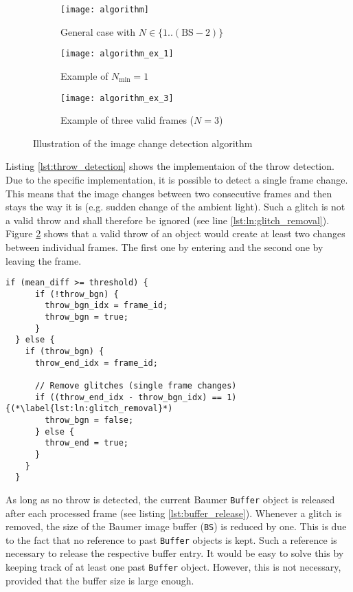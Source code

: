 \begin{figure}[H]
  \centering
  \begin{subfigure}[b]{\textwidth}
    \texttt{[image: algorithm]}
    \caption{General case with $N \in \{1..(\text{BS}-2)\}$}
    \label{subfig:algorithm_general_case}
  \end{subfigure}
  \begin{subfigure}[b]{\textwidth}
    \texttt{[image: algorithm\_ex\_1]}
    \caption{Example of $N_\text{min} = 1$}
    \label{subfig:algorithm_example_1}
  \end{subfigure}
  \begin{subfigure}[b]{\textwidth}
    \texttt{[image: algorithm\_ex\_3]}
    \caption{Example of three valid frames ($N = 3$)}
    \label{subfig:algorithm_example_3}
  \end{subfigure}
  \caption{Illustration of the image change detection algorithm}
  \label{fig:change_detection_algorithm}
\end{figure}

Listing \ref{lst:throw_detection} shows the implementaion of the throw detection.
Due to the specific implementation, it is possible to detect a single frame change.
This means that the image changes between two consecutive frames and then stays the way it is (e.g. sudden change of the ambient light).
Such a glitch is not a valid throw and shall therefore be ignored (see line \ref{lst:ln:glitch_removal}).
Figure \ref{subfig:algorithm_example_1} shows that a valid throw of an object would create at least two changes between individual frames.
The first one by entering and the second one by leaving the frame.

\begin{lstlisting}[style=C++, caption={Throw detection and glitch removal}, label=lst:throw_detection]
  if (mean_diff >= threshold) {
      if (!throw_bgn) {
        throw_bgn_idx = frame_id;
        throw_bgn = true;
      }
  } else {
    if (throw_bgn) {
      throw_end_idx = frame_id;

      // Remove glitches (single frame changes)
      if ((throw_end_idx - throw_bgn_idx) == 1) {(*\label{lst:ln:glitch_removal}*)
        throw_bgn = false;
      } else {
        throw_end = true;
      }
    }
  }
\end{lstlisting}

As long as no throw is detected, the current Baumer \texttt{Buffer} object is released after each processed frame (see listing \ref{lst:buffer_release}). %
Whenever a glitch is removed, the size of the Baumer image buffer (\texttt{BS}) is reduced by one.
This is due to the fact that no reference to past \texttt{Buffer} objects is kept.
Such a reference is necessary to release the respective buffer entry.
It would be easy to solve this by keeping track of at least one past \texttt{Buffer} object.
However, this is not necessary, provided that the buffer size is large enough.

